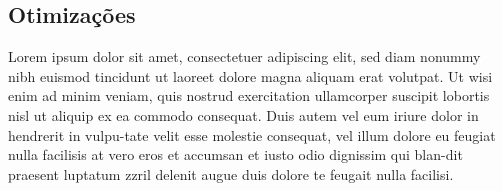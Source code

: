 \subsection{Otimizações}
\label{secao:otimizacoes}
Lorem ipsum dolor sit amet, consectetuer adipiscing elit, sed diam nonummy nibh euismod tincidunt ut laoreet dolore magna aliquam erat volutpat. Ut wisi enim ad minim veniam, quis nostrud exercitation ullamcorper suscipit lobortis nisl ut aliquip ex ea commodo consequat. Duis autem vel eum iriure dolor in hendrerit in vulpu-tate velit esse molestie consequat, vel illum dolore eu feugiat nulla facilisis at vero eros et accumsan et iusto odio dignissim qui blan-dit praesent luptatum zzril delenit augue duis dolore te feugait nulla facilisi.
